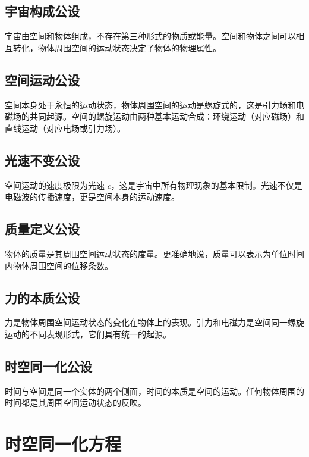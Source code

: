 \documentclass[12pt,a4paper]{article}
\begin{document}
\subsection{宇宙构成公设}
\label{subsection:universe_composition}

宇宙由空间和物体组成，不存在第三种形式的物质或能量。空间和物体之间可以相互转化，物体周围空间的运动状态决定了物体的物理属性。

\subsection{空间运动公设}
\label{subsection:space_motion}

空间本身处于永恒的运动状态，物体周围空间的运动是螺旋式的，这是引力场和电磁场的共同起源。空间的螺旋运动由两种基本运动合成：环绕运动（对应磁场）和直线运动（对应电场或引力场）。

\subsection{光速不变公设}
\label{subsection:constancy_of_light}

空间运动的速度极限为光速 $c$，这是宇宙中所有物理现象的基本限制。光速不仅是电磁波的传播速度，更是空间本身的运动速度。

\subsection{质量定义公设}
\label{subsection:mass_definition}

物体的质量是其周围空间运动状态的度量。更准确地说，质量可以表示为单位时间内物体周围空间的位移条数。

\subsection{力的本质公设}
\label{subsection:force_nature}

力是物体周围空间运动状态的变化在物体上的表现。引力和电磁力是空间同一螺旋运动的不同表现形式，它们具有统一的起源。

\subsection{时空同一化公设}
\label{subsection:spacetime_unification}

时间与空间是同一个实体的两个侧面，时间的本质是空间的运动。任何物体周围的时间都是其周围空间运动状态的反映。

\section{时空同一化方程}
\label{section:spacetime_equation}
\end{document}
